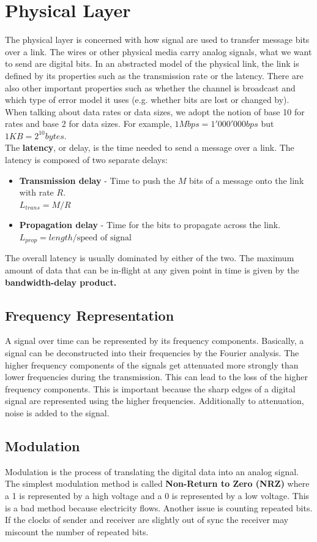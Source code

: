 \section{Physical Layer}
The physical layer is concerned with how signal are used to transfer message bits over a link. The wires or other physical media carry analog signals, what we want to send are digital bits. In an abstracted model of the physical link, the link is defined by its properties such as the transmission rate or the latency. There are also other important properties such as whether the channel is broadcast and which type of error model it uses (e.g. whether bits are lost or changed by). When talking about data rates or data sizes, we adopt the notion of base 10 for rates and base 2 for data sizes. For example, $ 1 Mbps = 1'000'000 bps$ but $1 KB = 2^{10} bytes$. \\
The \textbf{latency}, or delay, is the time needed to send a message over a link. The latency is composed of two separate delays:
\begin{itemize}
\item \textbf{Transmission delay} - Time to push the $M$ bits of a message onto the link with rate $R$.\\
$L_{trans} = M/R$
\item \textbf{Propagation delay} - Time for the bits to propagate across the link.\\
$L_{prop} = length/\text{speed of signal}$
\end{itemize}
The overall latency is usually dominated by either of the two. The maximum amount of data that can be in-flight at any given point in time is given by the \textbf{bandwidth-delay product.}

\subsection{Frequency Representation}
A signal over time can be represented by its frequency components. Basically, a signal can be deconstructed into their frequencies by the Fourier analysis. The higher frequency components of the signals get attenuated more strongly than lower frequencies during the transmission. This can lead to the loss of the higher frequency components. This is important because the sharp edges of a digital signal are represented using the higher frequencies. Additionally to attenuation, noise is added to the signal.

\subsection{Modulation}
Modulation is the process of translating the digital data into an analog signal. The simplest modulation method is called \textbf{Non-Return to Zero (NRZ)} where a 1 is represented by a high voltage and a 0 is represented by a low voltage. This is a bad method because electricity flows. Another issue is counting repeated bits. If the clocks of sender and receiver are slightly out of sync the receiver may miscount the number of repeated bits.\vspace{.3cm}\\

